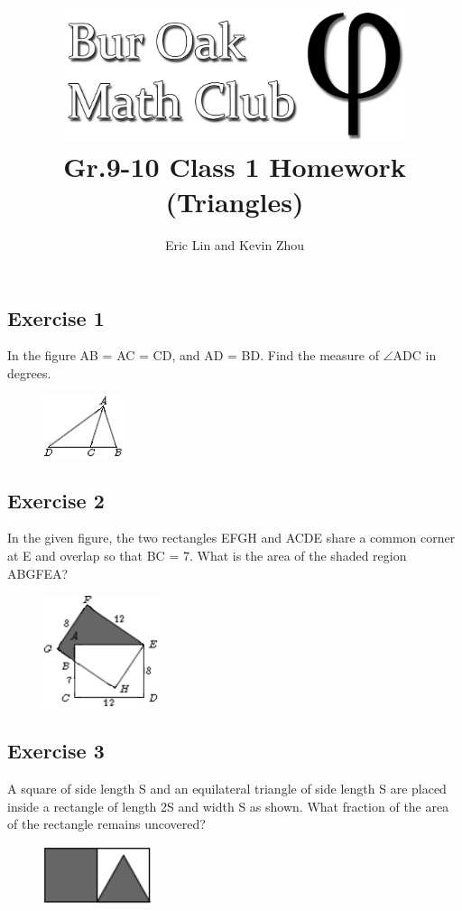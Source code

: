 \documentclass[12pt]{article}
\author{Eric Lin and Kevin Zhou}
\title{\includegraphics[width=10cm]{Bur Oak Math Club Banner Bold.png}\\\vspace{0.25in} Gr.9-10 Class 1 Homework (Triangles)}
\begin{document}
\maketitle

\subsection*{Exercise 1}
In the figure AB = AC = CD, and AD = BD. Find the measure of $\angle$ADC in degrees.\\
\vspace*{-0.3in}
\begin{figure}[h]
    \includegraphics[scale=1.25]{image1.png}
\end{figure}

\vspace{0.50in} %

\subsection*{Exercise 2}
In the given figure, the two rectangles EFGH and ACDE share a common corner at E and overlap so
that BC = 7. What is the area of the shaded region ABGFEA?\\
\vspace*{-0.3in}
\begin{figure}[h]
    \includegraphics[scale=0.90]{image2.png}
\end{figure}

\vspace{2in} %

\vspace{3in}

\subsection*{Exercise 3}
A square of side length S and an equilateral triangle of side length S are placed inside a rectangle of
length 2S and width S as shown. What fraction of the area of the rectangle remains uncovered?
\vspace*{-0.1in}
\begin{figure}[h]
    \includegraphics[scale=0.90]{image3.png}
\end{figure}
\end{document}
